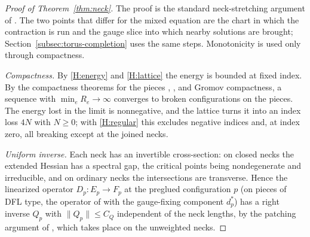 \documentclass[11pt]{amsart}
\theoremstyle{definition}
\theoremstyle{remark}
\theoremstyle{plain}
\numberwithin{equation}{section}
\begin{document}
\begin{proof}[Proof of Theorem~\ref{thm:neck}]
The proof is the standard neck-stretching argument of \cite[Chapters~3--5]{Donaldson-book}.
The two points that differ for the mixed equation are the chart in which the contraction is run
and the gauge slice into which nearby solutions are brought; Section~\ref{subsec:torus-completion}
uses the same steps. Monotonicity is used only through compactness.

\emph{Compactness.} By \ref{H:energy} and \ref{H:lattice} the energy is bounded at fixed
index. By the compactness theorems for the pieces \cite[Theorems~5.1--5.2]{DFL},
\cite[Theorem~3]{DFL-mixed}, \cite[Theorem~5.4]{Donaldson-book} and Gromov compactness, a
sequence with $\min_eR_e\to\infty$ converges to broken configurations on the pieces. The energy
lost in the limit is nonnegative, and the lattice turns it into an index loss $4N$ with $N\ge0$;
with \ref{H:regular} this excludes negative indices and, at index zero, all breaking except at
the joined necks.

\emph{Uniform inverse.} Each neck has an invertible cross-section: on closed necks the
extended Hessian has a spectral gap, the critical points being nondegenerate and irreducible,
and on ordinary necks the intersections are transverse. Hence the linearized operator
$D_p\colon E_p\to F_p$ at the preglued configuration $p$ (on pieces of DFL type, the operator of
\cite[(4.8)]{DFL} with the gauge-fixing component $d_p^*$) has a right inverse $Q_p$ with
$\|Q_p\|\le C_Q$ independent of the neck lengths, by the patching argument of
\cite[Proposition~3.9]{Donaldson-book}, which takes place on the unweighted necks.


\end{proof}
\end{document}
